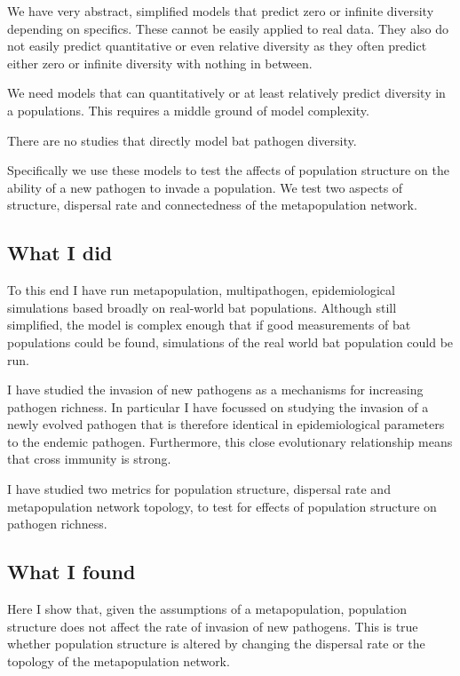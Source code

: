 We have very abstract, simplified models that predict zero or infinite diversity depending on specifics.
These cannot be easily applied to real data.
They also do not easily predict quantitative or even relative diversity as they often predict either zero or infinite diversity with nothing in between.

We need models that can quantitatively or at least relatively predict diversity in a populations.
This requires a middle ground of model complexity.

There are no studies that directly model bat pathogen diversity.

Specifically we use these models to test the affects of population structure on the ability of a new pathogen to invade a population.
We test two aspects of structure, dispersal rate and connectedness of the metapopulation network.


\subsection{What I did}


To this end I have run metapopulation, multipathogen, epidemiological simulations based broadly on real-world bat populations.
Although still simplified, the model is complex enough that if good measurements of bat populations could be found, simulations of the real world bat population could be run.

I have studied the invasion of new pathogens as a mechanisms for increasing pathogen richness.
In particular I have focussed on studying the invasion of a newly evolved pathogen that is therefore identical in epidemiological parameters to the endemic pathogen.
Furthermore, this close evolutionary relationship means that cross immunity is strong.

I have studied two metrics for population structure, dispersal rate and metapopulation network topology, to test for effects of population structure on pathogen richness.

\subsection{What I found}

Here I show that, given the assumptions of a metapopulation, population structure does not affect the rate of invasion of new pathogens.
This is true whether population structure is altered by changing the dispersal rate or the topology of the metapopulation network.




